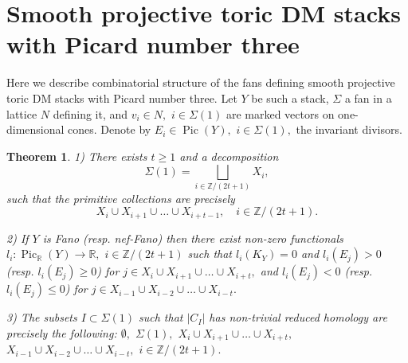 \documentclass[11pt,leqno]{amsart}
\newtheorem{theo}{Theorem}[section]
\numberwithin{equation}{section}
\def\R{\mathbb{R}}
\def\Z{\mathbb{Z}}
\newcommand{\Pic}{\operatorname{Pic}}
\begin{document}
\appendix

\section{Smooth projective toric DM stacks with Picard number three}
\label{Appendix}

Here we describe combinatorial structure of the fans defining smooth projective toric DM stacks with Picard number three.
Let $Y$ be such a stack, $\Sigma$ a fan in a lattice $N$ defining it, and $v_i\in N,$ $i\in\Sigma(1)$ are marked vectors
on one-dimensional cones. Denote by $E_i\in\Pic(Y),$ $i\in\Sigma(1),$ the invariant divisors.

\begin{theo}\label{description}1) There exists $t\geq 1$ and a decomposition $$\Sigma(1)=\bigsqcup\limits_{i\in\Z/(2t+1)}X_i,$$
such that the primitive collections
are precisely
\begin{equation}\label{primitive}X_i\cup X_{i+1}\cup\dots\cup X_{i+t-1},\quad i\in\Z/(2t+1).\end{equation}

2) If $Y$ is Fano (resp. nef-Fano) then there exist non-zero functionals $l_i:\Pic_{\R}(Y)\to\R,$ $i\in\Z/(2t+1)$ such that $l_i(K_Y)=0$ and
$l_i(E_j)>0$ (resp. $l_i(E_j)\geq 0$) for $j\in X_i\cup X_{i+1}\cup\dots\cup X_{i+t},$ and
$l_i(E_j)<0$ (resp. $l_i(E_j)\leq 0$) for $j\in X_{i-1}\cup X_{i-2}\cup\dots\cup X_{i-t}.$

3) The subsets $I\subset\Sigma(1)$ such that $|C_I|$ has non-trivial reduced homology are precisely the following:
$\emptyset,$ $\Sigma(1),$ $X_i\cup X_{i+1}\cup\dots\cup X_{i+t},$ $X_{i-1}\cup X_{i-2}\cup\dots\cup X_{i-t},$ $i\in\Z/(2t+1).$ \end{theo}
\end{document}

